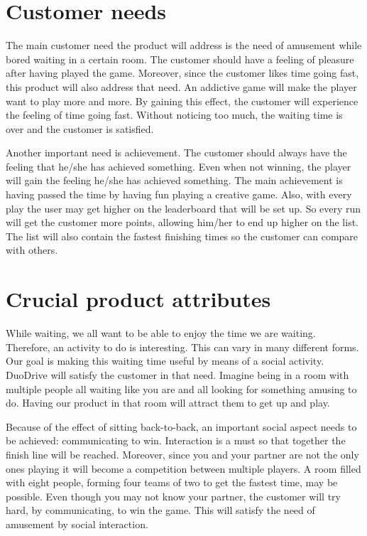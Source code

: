 \documentclass[11pt,twoside,a4paper]{article}
\begin{document}
\section{Customer needs}
The main customer need the product will address is the need of amusement while bored waiting in a certain room. The customer should have a feeling of pleasure after having played the game. Moreover, since the customer likes time going fast, this product will also address that need. An addictive game will make the player want to play more and more. By gaining this effect, the customer will experience the feeling of time going fast. Without noticing too much, the waiting time is over and the customer is satisfied.

Another important need is achievement. The customer should always have the feeling that he/she has achieved something. Even when not winning, the player will gain the feeling he/she has achieved something. The main achievement is having passed the time by having fun playing a creative game. Also, with every play the user may get higher on the leaderboard that will be set up. So every run will get the customer more points, allowing him/her to end up higher on the list. The list will also contain the fastest finishing times so the customer can compare with others.


\section{Crucial product attributes}
While waiting, we all want to be able to enjoy the time we are waiting. Therefore, an activity to do is interesting. This can vary in many different forms. Our goal is making this waiting time useful by means of a social activity. DuoDrive will satisfy the customer in that need. Imagine being in a room with multiple people all waiting like you are and all looking for something amusing to do. Having our product in that room will attract them to get up and play.

Because of the effect of sitting back-to-back, an important social aspect needs to be achieved: communicating to win. Interaction is a must so that together the finish line will be reached. Moreover, since you and your partner are not the only ones playing it will become a competition between multiple players. A room filled with eight people, forming four teams of two to get the fastest time, may be possible. Even though you may not know your partner, the customer will try hard, by communicating, to win the game. This will satisfy the need of amusement by social interaction.
\end{document}
